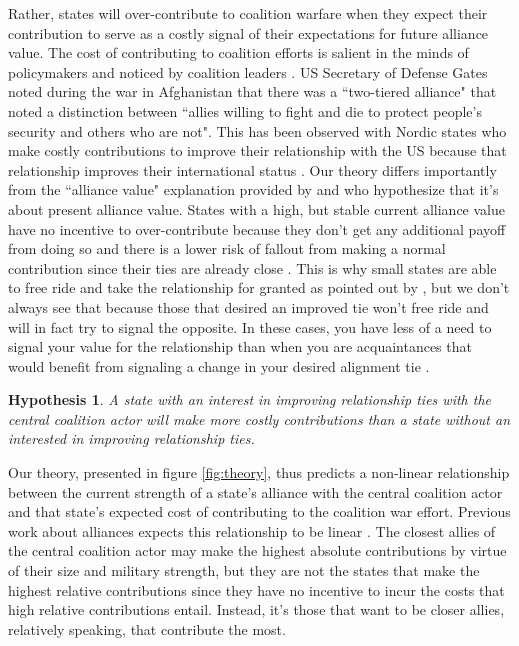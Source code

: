 \documentclass[12pt,letterpaper]{article}
\newtheorem{hyp}{Hypothesis}
\begin{document}
		Rather, states will over-contribute to coalition warfare when they expect their contribution to serve as a costly signal of their expectations for future alliance value. The cost of contributing to coalition efforts is salient in the minds of policymakers and noticed by coalition leaders \citep{ringsmose_natoburdensharingredux_2010}. US Secretary of Defense Gates noted during the war in Afghanistan that there was a ``two-tiered alliance" that noted a distinction between ``allies willing to fight and die to protect people's security and others who are not". This has been observed with Nordic states who make costly contributions to improve their relationship with the US because that relationship improves their international status \citep{pedersen_bandwagonstatuschanging_2018}. Our theory differs importantly from the ``alliance value" explanation provided by \citet{davidson_americaallieswar_2011} and \citet{massie_democraticalliesfollowership_2016} who hypothesize that it's about present alliance value. States with a high, but stable current alliance value have no incentive to over-contribute because they don't get any additional payoff from doing so and there is a lower risk of fallout from making a normal contribution since their ties are already close \citep{davidson_headingexitsdemocratic_2014}. This is why small states are able to free ride and take the relationship for granted as pointed out by \citet{keohane_biginfluencesmall_1971}, but we don't always see that because those that desired an improved tie won't free ride and will in fact try to signal the opposite. In these cases, you have less of a need to signal your value for the relationship than when you are acquaintances that would benefit from signaling a change in your desired alignment tie \citep{gartzke_contractsfriendsalliances_2012, gibler_priorcommitmentscompatible_2004}.

		\begin{hyp}
			A state with an interest in improving relationship ties with the central coalition actor will make more costly contributions than a state without an interested in improving relationship ties.
		\end{hyp}

		Our theory, presented in figure \ref{fig:theory}, thus predicts a non-linear relationship between the current strength of a state's alliance with the central coalition actor and that state's expected cost of contributing to the coalition war effort. Previous work about alliances expects this relationship to be linear \citep{massie_democraticalliesfollowership_2016, haesebrouck_explainingmemberstates_2016, ringsmose_natoburdensharingredux_2010}. The closest allies of the central coalition actor may make the highest absolute contributions by virtue of their size and military strength, but they are not the states that make the highest relative contributions since they have no incentive to incur the costs that high relative contributions entail. Instead, it's those that want to be closer allies, relatively speaking, that contribute the most.
\end{document}
